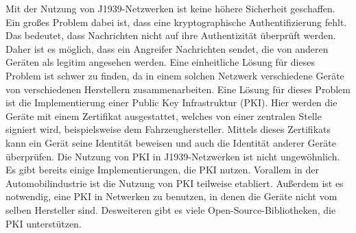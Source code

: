 Mit der Nutzung von J1939-Netzwerken ist keine höhere Sicherheit geschaffen. Ein großes Problem dabei ist, dass
eine kryptographische Authentifizierung fehlt. Das bedeutet, dass Nachrichten nicht auf ihre Authentizität überprüft werden.
Daher ist es möglich, dass ein Angreifer Nachrichten sendet, die von anderen Geräten als legitim angesehen werden.
Eine einheitliche Lösung für dieses Problem ist schwer zu finden, da in einem solchen Netzwerk verschiedene Geräte
von verschiedenen Herstellern zusammenarbeiten. Eine Lösung für dieses Problem ist die Implementierung einer Public Key Infrastruktur (PKI).
Hier werden die Geräte mit einem Zertifikat ausgestattet, welches von einer zentralen Stelle signiert wird, beispielsweise
dem Fahrzeughersteller. Mittels dieses Zertifikats kann ein Gerät seine Identität beweisen und auch die Identität anderer Geräte
überprüfen. 
Die Nutzung von PKI in J1939-Netzwerken ist nicht ungewöhnlich. Es gibt bereits einige Implementierungen, die PKI nutzen.
Vorallem in der Automobilindustrie ist die Nutzung von PKI teilweise etabliert. Außerdem ist es notwendig, eine PKI in 
Netwerken zu benutzen, in denen die Geräte nicht vom selben Hersteller sind.
Desweiteren gibt es viele Open-Source-Bibliotheken,
die PKI unterstützen. 
\cite{Murvay2018} \\
